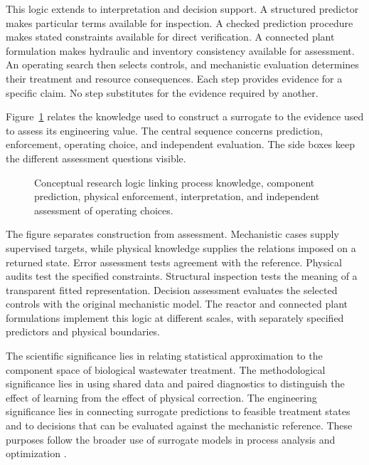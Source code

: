 This logic extends to interpretation and decision support. A structured predictor makes particular terms available for inspection. A checked prediction procedure makes stated constraints available for direct verification. A connected plant formulation makes hydraulic and inventory consistency available for assessment. An operating search then selects controls, and mechanistic evaluation determines their treatment and resource consequences. Each step provides evidence for a specific claim. No step substitutes for the evidence required by another.

Figure~\ref{fig:research_conceptual_logic} relates the knowledge used to construct a surrogate to the evidence used to assess its engineering value. The central sequence concerns prediction, enforcement, operating choice, and independent evaluation. The side boxes keep the different assessment questions visible.

\begin{figure}[htbp]
\centering

\caption{Conceptual research logic linking process knowledge, component prediction, physical enforcement, interpretation, and independent assessment of operating choices.}
\label{fig:research_conceptual_logic}
\end{figure}

The figure separates construction from assessment. Mechanistic cases supply supervised targets, while physical knowledge supplies the relations imposed on a returned state. Error assessment tests agreement with the reference. Physical audits test the specified constraints. Structural inspection tests the meaning of a transparent fitted representation. Decision assessment evaluates the selected controls with the original mechanistic model. The reactor and connected plant formulations implement this logic at different scales, with separately specified predictors and physical boundaries.

The scientific significance lies in relating statistical approximation to the component space of biological wastewater treatment. The methodological significance lies in using shared data and paired diagnostics to distinguish the effect of learning from the effect of physical correction. The engineering significance lies in connecting surrogate predictions to feasible treatment states and to decisions that can be evaluated against the mechanistic reference. These purposes follow the broader use of surrogate models in process analysis and optimization \citep{McBride2019,BhosekarIerapetritou2018}.

